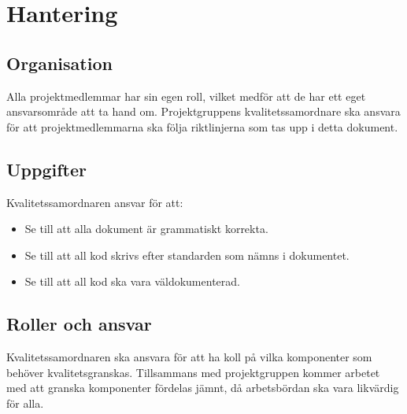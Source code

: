 \section{Hantering}

\subsection{Organisation}
Alla projektmedlemmar har sin egen roll, vilket medför att de har ett eget ansvarsområde att ta hand om. Projektgruppens kvalitetssamordnare ska ansvara för att projektmedlemmarna ska följa riktlinjerna som tas upp i detta dokument.

\subsection{Uppgifter}
Kvalitetssamordnaren ansvar för att:
\begin{itemize}
\item Se till att alla dokument är grammatiskt korrekta. 
\item Se till att all kod skrivs efter standarden som nämns i dokumentet.
\item Se till att all kod ska vara väldokumenterad.
\end{itemize}

\subsection{Roller och ansvar}
Kvalitetssamordnaren ska ansvara för att ha koll på vilka komponenter som behöver kvalitetsgranskas. Tillsammans med projektgruppen kommer arbetet med att granska komponenter fördelas jämnt, då arbetsbördan ska vara likvärdig för alla.




